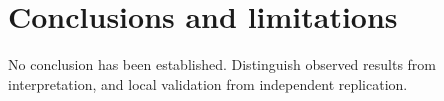 \section{Conclusions and limitations}
\label{sec:conclusions}
No conclusion has been established. Distinguish observed results from
interpretation, and local validation from independent replication.
